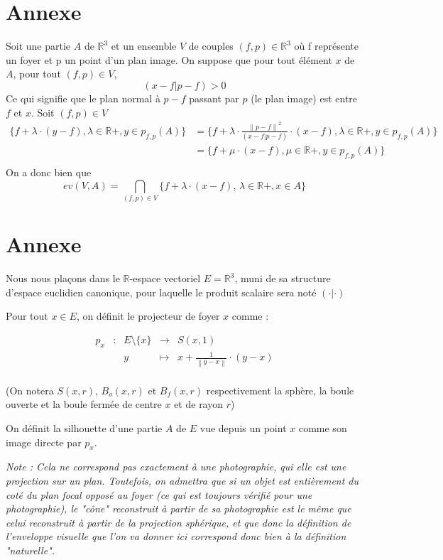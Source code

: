 \documentclass[a4paper]{article}
\newcommand{\norm}[1]{\left\lVert#1\right\rVert}
\begin{document}
  \section{Annexe}\label{AnnexeA}
    Soit une partie $A$ de $\mathbb{R}^3$ et un ensemble $V$ de couples $(f, p) \in \mathbb{R}^3$ où f représente un foyer et p un point d'un plan image. On suppose que pour tout élément $x$ de $A$, pour tout $(f, p) \in V$,  
    \[(x - f | p - f) > 0\]
    Ce qui signifie que le plan normal à $p - f$ passant par $p$ (le plan image) est entre $f$ et $x$.
    Soit $(f, p) \in V$
    \begin{align*}
      \{f + \lambda \cdot (y - f), \lambda \in \mathbb{R}+, y \in p_{f, p}(A)\}
      &= \{f + \lambda \cdot \frac{\norm{p - f}^2}{(x - f | p - f)} \cdot (x - f), \lambda \in \mathbb{R}+, y \in p_{f, p}(A)\}\\
      &= \{f + \mu \cdot (x - f), \mu \in \mathbb{R}+, y \in p_{f, p}(A)\}\\
    \end{align*}
    On a donc bien que
    \[
      ev(V, A) = \bigcap_{(f, p) \in V} \{f + \lambda \cdot (x - f), \, \lambda \in \mathbb{R}+, x \in A\}
    \]
  \section{Annexe}\label{AnnexeB}
    Nous nous plaçons dans le $\mathbb{R}$-espace vectoriel $E = \mathbb{R}^{3}$, muni de sa structure d'espace euclidien canonique, pour laquelle le produit scalaire sera noté $(\cdot|\cdot)$


    Pour tout $x\in E$, on définit le projecteur de foyer $x$ comme :

    \[\begin{array}{ccccl}
    p_{x} & : & E\setminus\{x\} & \to & S(x, 1) \\
     & & y & \mapsto & x  + \frac{1}{\norm{y - x}} \cdot (y - x) \\
    \end{array}\]

    (On notera $S(x, r)$, $B_{o}(x, r)$ et $B_{f}(x, r)$ respectivement la sphère, la boule ouverte et la boule fermée de centre $x$ et de rayon $r$)


    On définit la silhouette d'une  partie $A$ de $E$ vue depuis un point $x$ comme son image directe par $p_{x}$.

    \textit{Note : Cela ne correspond pas exactement à une photographie, qui elle est une projection sur un plan. Toutefois, on admettra que si un objet est entièrement du coté du plan focal opposé au foyer (ce qui est toujours vérifié pour une photographie), le "cône" reconstruit à partir de sa photographie est le même que celui reconstruit à partir de la projection sphérique, et que donc la définition de l'enveloppe visuelle que l'on va donner ici correspond donc bien à la définition "naturelle".}
\end{document}
